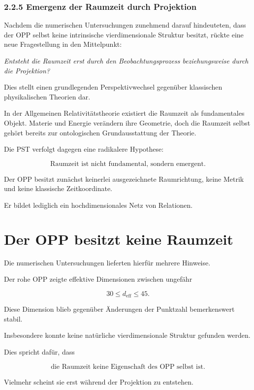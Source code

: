 \subsubsection{2.2.5 Emergenz der Raumzeit durch Projektion}

Nachdem die numerischen Untersuchungen zunehmend darauf hindeuteten, dass der OPP selbst keine intrinsische vierdimensionale Struktur besitzt, rückte eine neue Fragestellung in den Mittelpunkt:

\begin{center}
\emph{Entsteht die Raumzeit erst durch den Beobachtungsprozess beziehungsweise durch die Projektion?}
\end{center}

Dies stellt einen grundlegenden Perspektivwechsel gegenüber klassischen physikalischen Theorien dar.

In der Allgemeinen Relativitätstheorie existiert die Raumzeit als fundamentales Objekt. Materie und Energie verändern ihre Geometrie, doch die Raumzeit selbst gehört bereits zur ontologischen Grundausstattung der Theorie.

Die PST verfolgt dagegen eine radikalere Hypothese:

\[
\boxed{
\text{Raumzeit ist nicht fundamental, sondern emergent.}
}
\]

Der OPP besitzt zunächst keinerlei ausgezeichnete Raumrichtung, keine Metrik und keine klassische Zeitkoordinate.

Er bildet lediglich ein hochdimensionales Netz von Relationen.

\section*{Der OPP besitzt keine Raumzeit}

Die numerischen Untersuchungen lieferten hierfür mehrere Hinweise.

Der rohe OPP zeigte effektive Dimensionen zwischen ungefähr

\[
30
\le
d_{\mathrm{eff}}
\le
45.
\]

Diese Dimension blieb gegenüber Änderungen der Punktzahl bemerkenswert stabil.

Insbesondere konnte keine natürliche vierdimensionale Struktur gefunden werden.

Dies spricht dafür, dass

\[
\boxed{
\text{die Raumzeit keine Eigenschaft des OPP selbst ist.}
}
\]

Vielmehr scheint sie erst während der Projektion zu entstehen.

